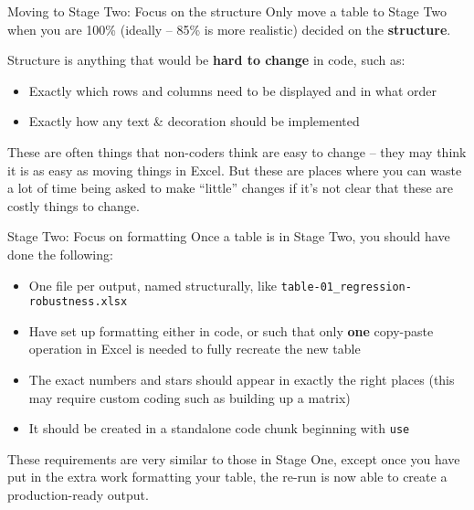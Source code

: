 \documentclass[aspectratio=169]{beamer}
\begin{document}

\begin{frame}[fragile]{Moving to Stage Two: Focus on the structure}
Only move a table to Stage Two when you are 100\% (ideally -- 85\% is more realistic) decided on the \textbf{structure}.

Structure is anything that would be \textbf{hard to change} in code, such as:
\begin{itemize}
    \item Exactly which rows and columns need to be displayed and in what order
    \item Exactly how any text & decoration should be implemented
\end{itemize}
These are often things that non-coders think are easy to change -- they may think it is as easy as moving things in Excel. But these are places where you can waste a lot of time being asked to make ``little'' changes if it's not clear that these are costly things to change.
\end{frame}

\begin{frame}[fragile]{Stage Two: Focus on formatting}
Once a table is in Stage Two, you should have done the following:
\begin{itemize}
    \item One file per output, named structurally, like \texttt{table-01\_regression-robustness.xlsx}
    \item Have set up formatting either in code, or such that only \textbf{one} copy-paste operation in Excel is needed to fully recreate the new table
    \item The exact numbers and stars should appear in exactly the right places (this may require custom coding such as building up a matrix)
    \item It should be created in a standalone code chunk beginning with \texttt{use}
\end{itemize}
These requirements are very similar to those in Stage One, except once you have put in the extra work formatting your table, the re-run is now able to create a production-ready output.
\end{frame}
\end{document}
